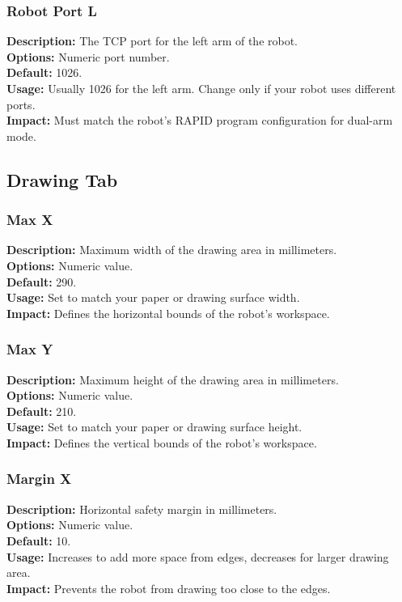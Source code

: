 \documentclass[a4paper,12pt]{article}
\begin{document}
\subsubsection{Robot Port L}
\textbf{Description:} The TCP port for the left arm of the robot.\\
\textbf{Options:} Numeric port number.\\
\textbf{Default:} 1026.\\
\textbf{Usage:} Usually 1026 for the left arm. Change only if your robot uses different ports.\\
\textbf{Impact:} Must match the robot's RAPID program configuration for dual-arm mode.

\subsection{Drawing Tab}

\subsubsection{Max X}
\textbf{Description:} Maximum width of the drawing area in millimeters.\\
\textbf{Options:} Numeric value.\\
\textbf{Default:} 290.\\
\textbf{Usage:} Set to match your paper or drawing surface width.\\
\textbf{Impact:} Defines the horizontal bounds of the robot's workspace.

\subsubsection{Max Y}
\textbf{Description:} Maximum height of the drawing area in millimeters.\\
\textbf{Options:} Numeric value.\\
\textbf{Default:} 210.\\
\textbf{Usage:} Set to match your paper or drawing surface height.\\
\textbf{Impact:} Defines the vertical bounds of the robot's workspace.

\subsubsection{Margin X}
\textbf{Description:} Horizontal safety margin in millimeters.\\
\textbf{Options:} Numeric value.\\
\textbf{Default:} 10.\\
\textbf{Usage:} Increases to add more space from edges, decreases for larger drawing area.\\
\textbf{Impact:} Prevents the robot from drawing too close to the edges.
\end{document}
